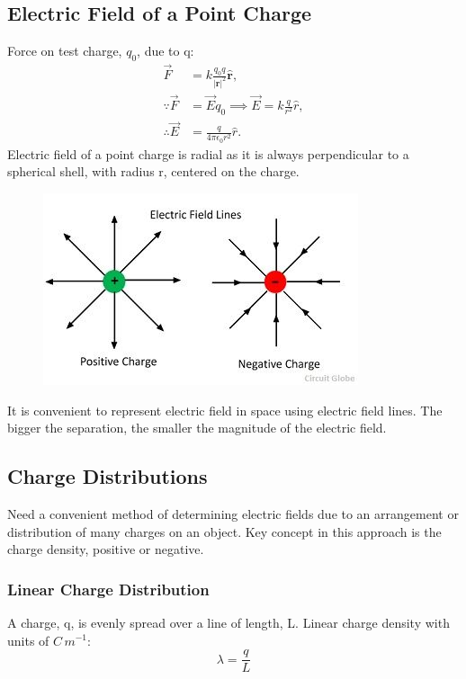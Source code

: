 \documentclass[a4paper, 11pt, normalem]{report}
\begin{document}
\chapter{}
\section{Electric Field of a Point Charge}
Force on test charge, $q_{0}$, due to q:
\begin{align}
    \vec{F} &= k\frac{q_{0}q}{|\mathbf{r}|^{2}} \mathbf{\hat{r}}, \\
    \because \vec{F} &= \vec{E}q_{0} \implies \vec{E} = k\frac{q}{r^{2}}\hat{r}, \\
    \therefore \vec{E} &= \frac{q}{4\pi\epsilon_{0}r^{2}}\hat{r}.
\end{align}
Electric field of a point charge is radial as it is always perpendicular to a spherical shell, with radius r, centered on the charge.
\begin{figure}[H]
    \centering
    \includegraphics{electric-field-line.jpg}
\end{figure}
It is convenient to represent electric field in space using electric field lines. The bigger the separation, the smaller the magnitude of the electric field.

\section{Charge Distributions}
Need a convenient method of determining electric fields due to an arrangement or distribution of many charges on an object.
Key concept in this approach is the charge density, positive or negative.

\subsection{Linear Charge Distribution}
A charge, q, is evenly spread over a line of length, L.
Linear charge density with units of $C\,m^{-1}$:
\begin{equation}
    \lambda = \frac{q}{L}
\end{equation}
\end{document}
